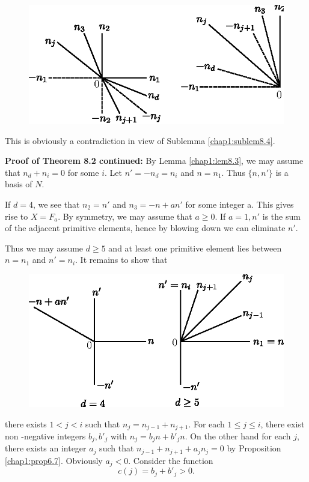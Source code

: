 \begin{figure}[H]
\centering 
\includegraphics{vol58-fig/fig58-15.eps} 
\end{figure}


\noindent
This is obviously a contradiction in view of  Sublemma \ref{chap1:sublem8.4}. 

\medskip\noindent
\textbf{Proof of Theorem 8.2 continued:} By Lemma \ref{chap1:lem8.3}, we may
assume that $n_d +n_i = 0 $ for some $i$. Let $n' = -n_d = n_i$ and $n
= n_1$. Thus $\{ n,n'\}$ is a basis of $N$. 

If  $d= 4$, we see that $n_2 = n'$ and $n_3 = -n + an'$ for some
integer a. This  gives rise to $X = F_a$. By symmetry, we may assume
that $a \geq 0$. If $a = 1, n'$ is the sum of the adjacent  primitive
elements, hence by blowing down  we  can eliminate $n'$.  

Thus we may assume $d \geq 5$ and at least one  primitive element lies
between $n=n_1$ and $n' = n_i$. It remains to show that  
\begin{figure}[H]
\centering 
\includegraphics{vol58-fig/fig58-16.eps} 
\end{figure}\pageoriginale
there exists $1<j<i$ such that $n_j = n_{j-1} + n_{j+1}$. For each $1
\leq j \leq i$, there exist non -negative integers  $b_j,b'_j$ with
$n_j = b_jn +b'_jn$. On the other hand for each $j$, there exists an
integer $a_j$ such that $n_{j-1} + n_{j+1} + a_j n_j = 0 $ by
Proposition \ref{chap1:prop6.7}. Obviously $a_j < 0$. Consider the  function  
$$
c(j) = b_j + b'_j > 0.
$$

